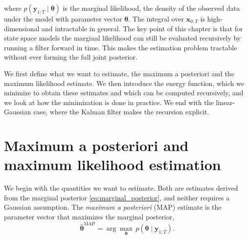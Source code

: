 where $p(\mathbf{y}_{1:T} \mid \boldsymbol{\theta})$ is the marginal likelihood, the density of the observed data under the model with parameter vector $\boldsymbol{\theta}$. The integral over $\mathbf{x}_{0:T}$ is high-dimensional and intractable in general. The key point of this chapter is that for state space models the marginal likelihood can still be evaluated recursively by running a filter forward in time. This makes the estimation problem tractable without ever forming the full joint posterior.


We first define what we want to estimate, the maximum a posteriori and the maximum likelihood estimate. We then introduce the energy function, which we minimize to obtain these estimates and which can be computed recursively, and we look at how the minimization is done in practice. We end with the linear-Gaussian case, where the Kalman filter makes the recursion explicit.

\section{Maximum a posteriori and maximum likelihood estimation}
We begin with the quantities we want to estimate. Both are estimates derived from the marginal posterior \eqref{eq:marginal_posterior}, and neither requires a Gaussian assumption.
The \emph{maximum a posteriori} (MAP) estimate is the parameter vector that maximizes the marginal posterior,
\begin{equation}\label{eq:map}
    \hat{\boldsymbol{\theta}}^{\mathrm{MAP}} = \arg\max_{\boldsymbol{\theta}} \, p(\boldsymbol{\theta} \mid \mathbf{y}_{1:T}).
\end{equation}


